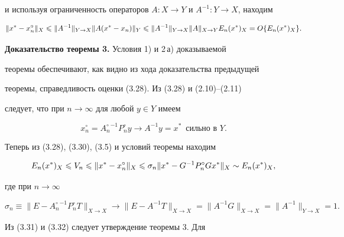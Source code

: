 и используя ограниченность операторов $A:X\to Y$ и $A^{-1}:Y\to


X$, находим


$$


\|x^* - x_n^\circ\|_X \lea \|A^{-1}\|_{Y\to X} \|A(x^* - x_n)\|_Y


\lea \|A^{-1}\|_{Y\to X}\|A\|_{X\to Y} E_n(x^*)_X =


O\{E_{n}(x^*)_X\}.


$$





{\bf Доказательство теоремы 3.} Условия 1) и 2\,а) доказываемой


теоремы обеспечивают, как видно из хода доказательства предыдущей


теоремы, справедливость оценки (3.28). Из (3.28) и (2.10)--(2.11)


следует, что при $n\to \infty$ для любой $y\in Y$ имеем


\begin{equation}


x_n^\circ = {A_n^\circ}^{-1}P_n^\circ y \to A^{-1} y = x^*


\ \; \text{сильно в $Y$}.


\end{equation}





Теперь из (3.28), (3.30), (3.5) и условий теоремы находим


\begin{equation}


E_n(x^*)_X \lea V_n \lea \|x^* - x_n^\circ\|_X \lea \sigma_n \|x^*


- G^{-1}P_n^\circ Gx^*\|_X \sim E_n(x^*)_X,


\end{equation}


где при $n\to \infty$


\begin{equation}


\sigma_n \equiv \|E - {A_n^\circ}^{-


1}P_n^\circ T\|_{X\to X} \to \|E -


A^{-1}T\|_{X\to X} = \|A^{-1}G\|_{X\to X} = \|A^{-1}\|_{Y\to X}=1.


\end{equation}





Из (3.31) и (3.32) следует утверждение теоремы 3. Для


